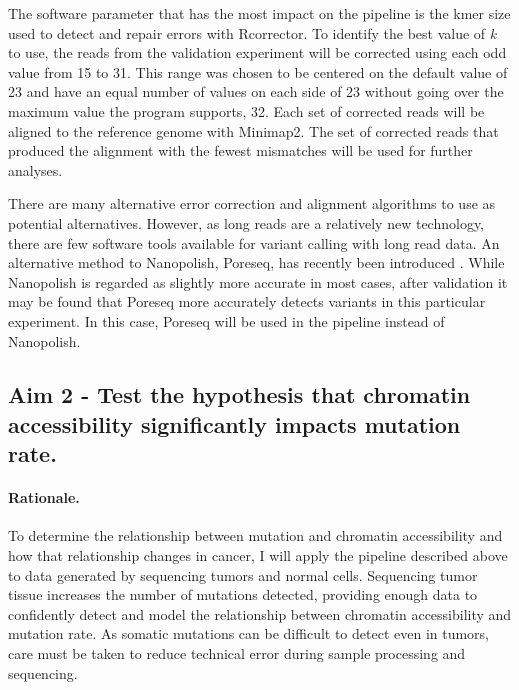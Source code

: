 The software parameter that has the most impact on the pipeline is the kmer size used to detect and repair errors with Rcorrector. To identify the best value of \textit{k} to use, the reads from the validation experiment will be corrected using each odd value from 15 to 31. This range was chosen to be centered on the default value of 23 and have an equal number of values on each side of 23 without going over the maximum value the program supports, 32.
Each set of corrected reads will be aligned to the reference genome with Minimap2. The set of corrected reads that produced the alignment with the fewest mismatches will be used for further analyses.

There are many alternative error correction and alignment algorithms to use as potential alternatives. However, as long reads are a relatively new technology, there are few software tools available for variant calling with long read data.
An alternative method to Nanopolish, Poreseq, has recently been introduced \parencite{szalay_novo_2015}. While Nanopolish is regarded as slightly more accurate in most cases, after validation it may be found that Poreseq more accurately detects variants in this particular experiment. In this case, Poreseq will be used in the pipeline instead of Nanopolish.



\subsection{Aim 2 - Test the hypothesis that chromatin accessibility significantly impacts mutation rate.}
\paragraph{Rationale.}
To determine the relationship between mutation and chromatin accessibility and how that relationship changes in cancer, I will apply the pipeline described above to data generated by sequencing tumors and normal cells. Sequencing tumor tissue increases the number of mutations detected, providing enough data to confidently detect and model the relationship between chromatin accessibility and mutation rate.
As somatic mutations can be difficult to detect even in tumors, care must be taken to reduce technical error during sample processing and sequencing.

